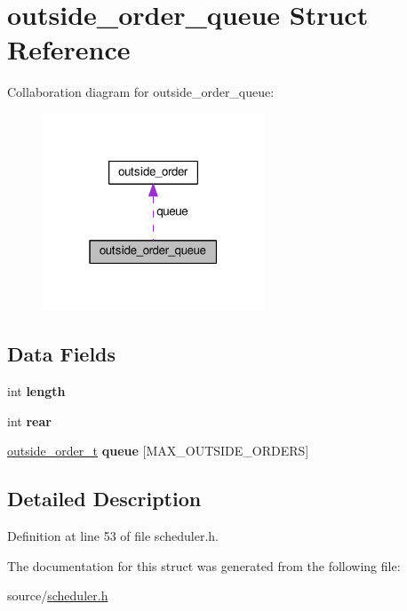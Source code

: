 \hypertarget{structoutside__order__queue}{}\section{outside\+\_\+order\+\_\+queue Struct Reference}
\label{structoutside__order__queue}


Collaboration diagram for outside\+\_\+order\+\_\+queue\+:\nopagebreak
\begin{figure}[H]
\begin{center}
\leavevmode
\includegraphics[width=187pt]{structoutside__order__queue__coll__graph}
\end{center}
\end{figure}
\subsection*{Data Fields}
\begin{DoxyCompactItemize}
\item 
int {\bfseries length}\hypertarget{structoutside__order__queue_a8259fe8daf9f79a1acb9523b5750bd77}{}\label{structoutside__order__queue_a8259fe8daf9f79a1acb9523b5750bd77}

\item 
int {\bfseries rear}\hypertarget{structoutside__order__queue_af5116728b6d122a7b020ed4bd1a32f1b}{}\label{structoutside__order__queue_af5116728b6d122a7b020ed4bd1a32f1b}

\item 
\hyperlink{structoutside__order}{outside\+\_\+order\+\_\+t} {\bfseries queue} \mbox{[}M\+A\+X\+\_\+\+O\+U\+T\+S\+I\+D\+E\+\_\+\+O\+R\+D\+E\+RS\mbox{]}\hypertarget{structoutside__order__queue_a42fc224e7f768fb3b882628d8c052ca4}{}\label{structoutside__order__queue_a42fc224e7f768fb3b882628d8c052ca4}

\end{DoxyCompactItemize}


\subsection{Detailed Description}


Definition at line 53 of file scheduler.\+h.



The documentation for this struct was generated from the following file\+:\begin{DoxyCompactItemize}
\item 
source/\hyperlink{scheduler_8h}{scheduler.\+h}\end{DoxyCompactItemize}
